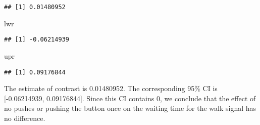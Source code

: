 \documentclass[
]{article}
\newenvironment{Shaded}{\begin{snugshade}}{\end{snugshade}}
\newcommand{\DecValTok}[1]{\textcolor[rgb]{0.00,0.00,0.81}{#1}}
\newcommand{\FloatTok}[1]{\textcolor[rgb]{0.00,0.00,0.81}{#1}}
\newcommand{\FunctionTok}[1]{\textcolor[rgb]{0.00,0.00,0.00}{#1}}
\newcommand{\NormalTok}[1]{#1}
\newcommand{\OtherTok}[1]{\textcolor[rgb]{0.56,0.35,0.01}{#1}}
\newcommand{\SpecialCharTok}[1]{\textcolor[rgb]{0.00,0.00,0.00}{#1}}
\begin{document}
\begin{Shaded}
\end{Shaded}

\begin{verbatim}
## [1] 0.01480952
\end{verbatim}

\begin{Shaded}
\begin{Highlighting}[]
\NormalTok{lwr}
\end{Highlighting}
\end{Shaded}

\begin{verbatim}
## [1] -0.06214939
\end{verbatim}

\begin{Shaded}
\begin{Highlighting}[]
\NormalTok{upr}
\end{Highlighting}
\end{Shaded}

\begin{verbatim}
## [1] 0.09176844
\end{verbatim}

The estimate of contrast is 0.01480952. The corresponding 95\% CI is
{[}-0.06214939, 0.09176844{]}. Since this CI contains 0, we conclude
that the effect of no pushes or pushing the button once on the waiting
time for the walk signal has no difference.
\end{document}
